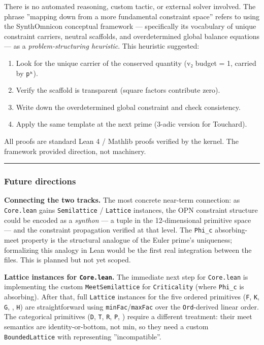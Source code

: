 \documentclass[12pt,a4paper]{article}
\begin{document}
There is no automated reasoning, custom tactic, or external solver involved. The phrase
''mapping down from a more fundamental constraint space'' refers to using the SynthOmnicon
conceptual framework --- specifically its vocabulary of unique constraint carriers, neutral
scaffolds, and overdetermined global balance equations --- as a \emph{problem-structuring heuristic}.
This heuristic suggested:

\begin{enumerate}
    \item Look for the unique carrier of the conserved quantity (v₂ budget = 1, carried by \texttt{pᵏ}).
    \item Verify the scaffold is transparent (square factors contribute zero).
    \item Write down the overdetermined global constraint and check consistency.
    \item Apply the same template at the next prime (3-adic version for Touchard).
\end{enumerate}

All proofs are standard Lean 4 / Mathlib proofs verified by the kernel. The framework provided
direction, not machinery.

\begin{center}
\rule{0.5\textwidth}{0.4pt}
\end{center}

\subsubsection{Future directions}

\textbf{Connecting the two tracks.} The most concrete near-term connection: as \texttt{Core.lean} gains
\texttt{Semilattice} / \texttt{Lattice} instances, the OPN constraint structure could be encoded as a
\emph{synthon} --- a tuple in the 12-dimensional primitive space --- and the constraint propagation
verified at that level. The \texttt{Phi\_c} absorbing-meet property is the structural analogue of
the Euler prime's uniqueness; formalizing this analogy in Lean would be the first real
integration between the files. This is planned but not yet scoped.

\textbf{Lattice instances for \texttt{Core.lean}.} The immediate next step for \texttt{Core.lean} is implementing
the custom \texttt{MeetSemilattice} for \texttt{Criticality} (where \texttt{Phi\_c} is absorbing). After that, full
\texttt{Lattice} instances for the five ordered primitives (\texttt{F}, \texttt{K}, \texttt{G}, \texttt{\Omega}, \texttt{H}) are
straightforward using \texttt{minFac}/\texttt{maxFac} over the \texttt{Ord}-derived linear order. The categorical
primitives (\texttt{D}, \texttt{T}, \texttt{R}, \texttt{P}, \texttt{\Gamma}) require a different treatment: their meet semantics are
identity-or-bottom, not min, so they need a custom \texttt{BoundedLattice} with \texttt{\perp} representing
''incompatible''.
\end{document}
